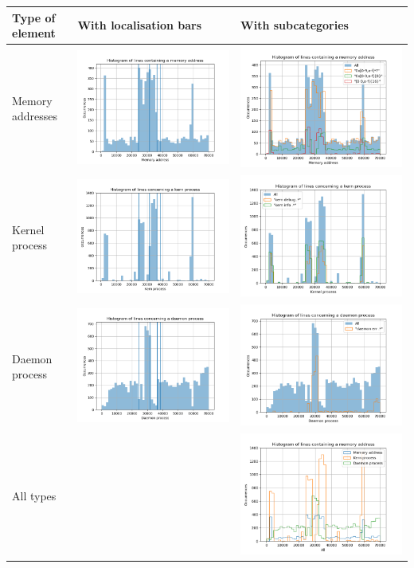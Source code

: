 \begin{longtable}[]{@{}lll@{}}
\hline
Type of element & With localisation bars & With
subcategories\tabularnewline
\hline
\endhead
Memory addresses & \includegraphics[width=.25\textwidth]{parts/appendix/reports-papud/2018_07_18-Performance_spike_analysis/memory_.png} &
\includegraphics[width=.25\textwidth]{parts/appendix/reports-papud/2018_07_18-Performance_spike_analysis/memory.png}\tabularnewline
Kernel process & \includegraphics[width=.25\textwidth]{parts/appendix/reports-papud/2018_07_18-Performance_spike_analysis/kern_.png} &
\includegraphics[width=.25\textwidth]{parts/appendix/reports-papud/2018_07_18-Performance_spike_analysis/kern.png}\tabularnewline
Daemon process & \includegraphics[width=.25\textwidth]{parts/appendix/reports-papud/2018_07_18-Performance_spike_analysis/daemon_.png} &
\includegraphics[width=.25\textwidth]{parts/appendix/reports-papud/2018_07_18-Performance_spike_analysis/daemon.png}\tabularnewline
All types & & \includegraphics[width=.25\textwidth]{parts/appendix/reports-papud/2018_07_18-Performance_spike_analysis/all.png}\tabularnewline
\hline
\end{longtable}

